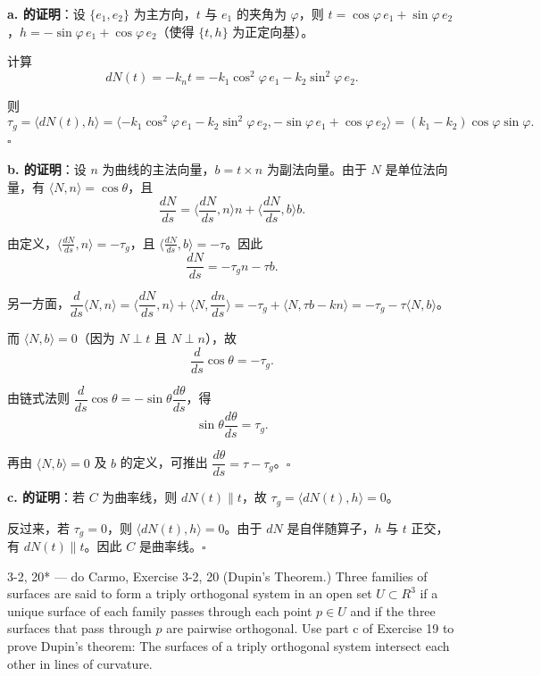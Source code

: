 \begin{solution}
\textbf{a. 的证明}：设 $\{e_1, e_2\}$ 为主方向，$t$ 与 $e_1$ 的夹角为 $\varphi$，则 $t = \cos\varphi \, e_1 + \sin\varphi \, e_2$，$h = -\sin\varphi \, e_1 + \cos\varphi \, e_2$（使得 $\{t, h\}$ 为正定向基）。

计算
\[
dN(t) = -k_n t = -k_1 \cos^2\varphi \, e_1 - k_2 \sin^2\varphi \, e_2.
\]

则
\[
\tau_g = \langle dN(t), h \rangle = \langle -k_1 \cos^2\varphi \, e_1 - k_2 \sin^2\varphi \, e_2, -\sin\varphi \, e_1 + \cos\varphi \, e_2 \rangle = (k_1 - k_2)\cos\varphi\sin\varphi.
\]
$\square$

\textbf{b. 的证明}：设 $n$ 为曲线的主法向量，$b = t \times n$ 为副法向量。由于 $N$ 是单位法向量，有 $\langle N, n \rangle = \cos\theta$，且
\[
\frac{dN}{ds} = \langle \frac{dN}{ds}, n \rangle n + \langle \frac{dN}{ds}, b \rangle b.
\]

由定义，$\langle \frac{dN}{ds}, n \rangle = -\tau_g$，且 $\langle \frac{dN}{ds}, b \rangle = -\tau$。因此
\[
\frac{dN}{ds} = -\tau_g n - \tau b.
\]

另一方面，$\dfrac{d}{ds}\langle N, n \rangle = \langle \dfrac{dN}{ds}, n \rangle + \langle N, \dfrac{dn}{ds} \rangle = -\tau_g + \langle N, \tau b - k n \rangle = -\tau_g - \tau \langle N, b \rangle$。

而 $\langle N, b \rangle = 0$（因为 $N \perp t$ 且 $N \perp n$），故
\[
\frac{d}{ds}\cos\theta = -\tau_g.
\]

由链式法则 $\dfrac{d}{ds}\cos\theta = -\sin\theta \dfrac{d\theta}{ds}$，得
\[
\sin\theta \frac{d\theta}{ds} = \tau_g.
\]

再由 $\langle N, b \rangle = 0$ 及 $b$ 的定义，可推出 $\dfrac{d\theta}{ds} = \tau - \tau_g$。$\square$

\textbf{c. 的证明}：若 $C$ 为曲率线，则 $dN(t) \parallel t$，故 $\tau_g = \langle dN(t), h \rangle = 0$。

反过来，若 $\tau_g = 0$，则 $\langle dN(t), h \rangle = 0$。由于 $dN$ 是自伴随算子，$h$ 与 $t$ 正交，有 $dN(t) \parallel t$。因此 $C$ 是曲率线。$\square$
\end{solution}

\begin{exercise}{3-2, 20* — do Carmo, Exercise 3-2, 20}
(Dupin's Theorem.) Three families of surfaces are said to form a triply orthogonal system in an open set $U \subset R^3$ if a unique surface of each family passes through each point $p \in U$ and if the three surfaces that pass through $p$ are pairwise orthogonal. Use part c of Exercise 19 to prove Dupin's theorem: The surfaces of a triply orthogonal system intersect each other in lines of curvature.
\end{exercise}

